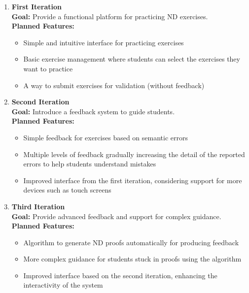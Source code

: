 \begin{enumerate}
\setlength{\itemsep}{5pt}
    \item \textbf{First Iteration} \\
    \textbf{Goal:} Provide a functional platform for practicing \gls{ND} exercises. \\
    \textbf{Planned Features:}
    \begin{itemize}
        \item Simple and intuitive interface for practicing exercises
        \item Basic exercise management where students can select the exercises they want to practice
        \item A way to submit exercises for validation (without feedback)
    \end{itemize}

    \item \textbf{Second Iteration} \\
    \textbf{Goal:} Introduce a feedback system to guide students. \\
    \textbf{Planned Features:}
    \begin{itemize}
        \item Simple feedback for exercises based on semantic errors
        \item Multiple levels of feedback gradually increasing the detail of the reported errors to help students understand mistakes
        \item Improved interface from the first iteration, considering support for more devices such as touch screens
    \end{itemize}

    \item \textbf{Third Iteration} \\
    \textbf{Goal:} Provide advanced feedback and support for complex guidance. \\
    \textbf{Planned Features:}
    \begin{itemize}
        \item Algorithm to generate \gls{ND} proofs automatically for producing feedback
        \item More complex guidance for students stuck in proofs using the algorithm
        \item Improved interface based on the second iteration, enhancing the interactivity of the system
    \end{itemize}
\end{enumerate}

